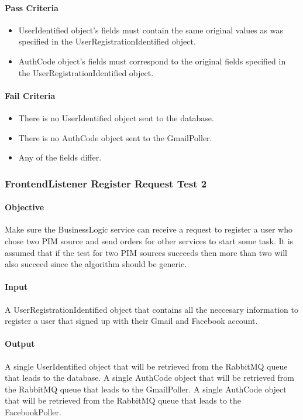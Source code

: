 \documentclass[hidelinks,english]{article}
\begin{document}
				\paragraph{Pass Criteria}
				\begin{itemize}
					\item UserIdentified object's fields must contain the same original values as was specified in the UserRegistrationIdentified object.
					\item AuthCode object's fields must correspond to the original fields specified in the UserRegistrationIdentified object.
				\end{itemize}
				\paragraph{Fail Criteria}
				\begin{itemize}
					\item There is no UserIdentified object sent to the database.
					\item There is no AuthCode object sent to the GmailPoller.
					\item Any of the fields differ.
				\end{itemize}
				
			\subsubsection{FrontendListener Register Request Test 2}\label{businessfrontendlistenerregistertest2}
				\paragraph{Objective} Make sure the BusinessLogic service can receive a request to register a user who chose two PIM source and send orders for other services to start some task. It is assumed that if the test for two PIM sources succeeds then more than two will also succeed since the algorithm should be generic.
				\paragraph{Input} A UserRegistrationIdentified object that contains all the neccesary information to register a user that signed up with their Gmail and Facebook account.
				\paragraph{Output} A single UserIdentified object that will be retrieved from the RabbitMQ queue that leads to the database. A single AuthCode object that will be retrieved from the RabbitMQ queue that leads to the GmailPoller. A single AuthCode object that will be retrieved from the RabbitMQ queue that leads to the FacebookPoller.
\end{document}
